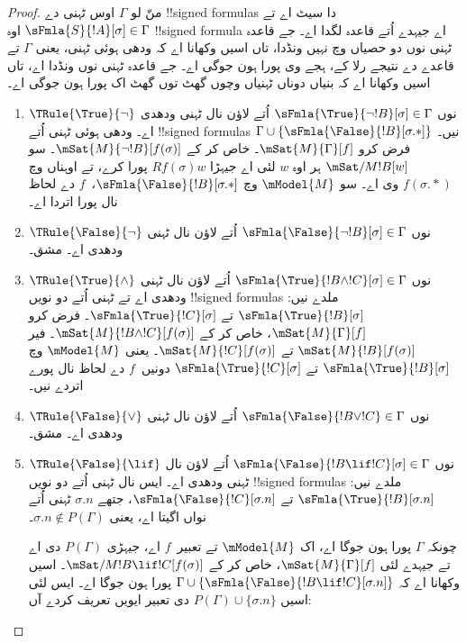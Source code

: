 \documentclass[../../../include/open-logic-section]{subfiles}
\begin{document}
\begin{proof}
منّ لو $\Gamma$ اوس ٹہنی دے !!{signed formula}s دا سیٹ اے تے
$\sFmla{S}{!A}[\sigma] \in \Gamma$ اوہ !!{signed formula} اے جیہدے اُتے
قاعدہ لگدا اے۔ جے قاعدہ ٹہنی نوں دو حصیاں وچ نہیں ونڈدا، تاں اسیں وکھانا اے
کہ ودھی ہوئی ٹہنی، یعنی $\Gamma$ تے قاعدے دے نتیجے رلا کے، ہجے وی پورا
ہون جوگی اے۔ جے قاعدہ ٹہنی نوں ونڈدا اے، تاں اسیں وکھانا اے کہ بنیاں دوناں
ٹہنیاں وچوں گھٹ توں گھٹ اک پورا ہون جوگی اے۔
\begin{enumerate}
\item $\TRule{\True}{\lnot}$ نوں $\sFmla{\True}{\lnot !B}[\sigma] \in \Gamma$
  اُتے لاؤن نال ٹہنی ودھدی اے۔ ودھی ہوئی ٹہنی اُتے !!{signed formula}s
  $\Gamma \cup \{\sFmla{\False}{!B}[\sigma.{*}]\}$ نیں۔
  فرض کرو $\mSat{M}{\Gamma}[f]$۔ خاص کر کے $\mSat{M}{\lnot !B}[f(\sigma)]$۔
  سو $\mSat/{M}{!B}[w]$ ہر اوہ $w$ لئی اے جیہڑا $Rf(\sigma)w$ پورا کرے،
  تے اوہناں وچ $f(\sigma.{*})$ وی اے۔ سو $\mModel{M}$ وچ
  $\sFmla{\False}{!B}[\sigma.{*}]$،~$f$ دے لحاظ نال پورا اتردا اے۔
\item $\TRule{\False}{\lnot}$ نوں $\sFmla{\False}{\lnot !B}[\sigma] \in \Gamma$
  اُتے لاؤن نال ٹہنی ودھدی اے۔ مشق۔
\item $\TRule{\True}{\land}$ نوں $\sFmla{\True}{!B \land !C}[\sigma] \in \Gamma$
  اُتے لاؤن نال ٹہنی ودھدی اے تے ٹہنی اُتے دو نویں !!{signed formula}s ملدے نیں:
  $\sFmla{\True}{!B}[\sigma]$ تے $\sFmla{\True}{!C}[\sigma]$۔ فرض کرو
  $\mSat{M}{\Gamma}[f]$، خاص کر کے $\mSat{M}{!B \land !C}[f(\sigma)]$۔
  فیر $\mSat{M}{!B}[f(\sigma)]$ تے $\mSat{M}{!C}[f(\sigma)]$۔
  یعنی $\mModel{M}$ وچ $\sFmla{\True}{!B}[\sigma]$ تے
  $\sFmla{\True}{!C}[\sigma]$ دونیں~$f$ دے لحاظ نال پورے اتردے نیں۔
\item $\TRule{\False}{\lor}$ نوں $\sFmla{\False}{!B \lor !C} \in \Gamma$
  اُتے لاؤن نال ٹہنی ودھدی اے۔ مشق۔
\item $\TRule{\False}{\lif}$ نوں $\sFmla{\False}{!B \lif !C}[\sigma] \in \Gamma$
  اُتے لاؤن نال ٹہنی ودھدی اے۔ ایس نال ٹہنی اُتے دو نویں !!{signed formula}s ملدے نیں:
  $\sFmla{\True}{!B}[\sigma.n]$ تے $\sFmla{\False}{!C}[\sigma.n]$، جتھے
  $\sigma.n$ ٹہنی اُتے نواں اگیتا اے، یعنی $\sigma.n \notin P(\Gamma)$۔

  چونکہ $\Gamma$ پورا ہون جوگا اے، اک $\mModel{M}$ تے تعبیر~$f$ اے، جیہڑی
  $P(\Gamma)$ دی اے تے جیہدے لئی $\mSat{M}{\Gamma}[f]$، خاص کر کے
  $\mSat/{M}{!B \lif !C}[f(\sigma)]$۔ اسیں وکھانا اے کہ
  $\Gamma \cup \{\sFmla{\False}{!B \lif !C}[\sigma.n]\}$ پورا ہون جوگا اے۔
  ایس لئی اسیں $P(\Gamma) \cup \{\sigma.n\}$ دی تعبیر ایویں تعریف کردے آں:


\end{enumerate}
\end{proof}
\end{document}
